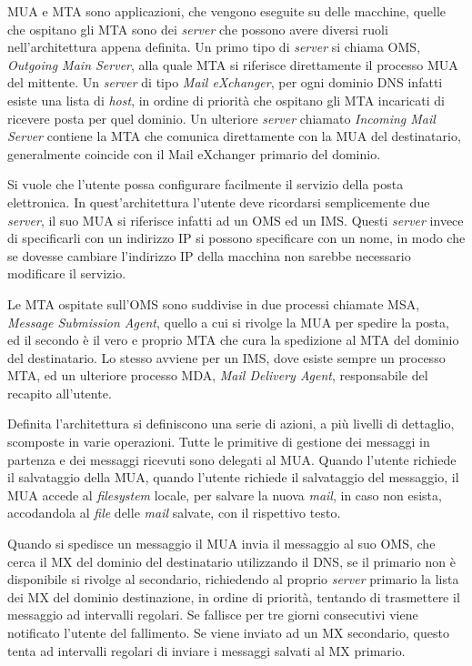 \documentclass{article}
\numberwithin{equation}{subsection}
\begin{document}
MUA e MTA sono applicazioni, che vengono eseguite su delle macchine, quelle che ospitano gli MTA sono dei \textit{server} che possono avere diversi ruoli nell'architettura appena definita. Un primo tipo di \textit{server} si chiama OMS, \textit{Outgoing Main Server}, alla quale MTA si riferisce direttamente il processo MUA del mittente. 
Un \textit{server} di tipo \textit{Mail eXchanger}, per ogni dominio \textcolor{Mahogany}{DNS} infatti esiste una lista di \textit{host}, in ordine di priorità che ospitano gli MTA incaricati di ricevere posta per quel dominio. 
Un ulteriore \textit{server} chiamato \textit{Incoming Mail Server} contiene la MTA che comunica direttamente con la MUA del destinatario, generalmente coincide con il Mail eXchanger primario del dominio. 

Si vuole che l'utente possa configurare facilmente il servizio della posta elettronica. In quest'architettura l'utente deve ricordarsi semplicemente due \textit{server}, il suo MUA si riferisce infatti ad un OMS ed un IMS. Questi \textit{server} invece di specificarli con un indirizzo \textcolor{Bittersweet}{IP} si possono specificare con un nome, in modo che se dovesse cambiare l'indirizzo \textcolor{Bittersweet}{IP} della macchina non sarebbe necessario modificare il servizio. 

Le MTA ospitate sull'OMS sono suddivise in due processi chiamate MSA, \textit{Message Submission Agent}, quello a cui si rivolge la MUA per spedire la posta, ed il secondo è il vero e proprio MTA che cura la spedizione al MTA del dominio del destinatario. Lo stesso avviene per un IMS, dove esiste sempre un processo MTA, ed un ulteriore processo MDA, \textit{Mail Delivery Agent}, responsabile del recapito all'utente. 


Definita l'architettura si definiscono una serie di azioni, a più livelli di dettaglio, scomposte in varie operazioni. Tutte le primitive di gestione dei messaggi in partenza e dei messaggi ricevuti 
sono delegati al MUA. Quando l'utente richiede il salvataggio della MUA, quando l'utente richiede il salvataggio del messaggio, il MUA accede al \textit{filesystem} locale, per salvare la nuova \textit{mail}, in caso non esista, accodandola al \textit{file} delle \textit{mail} salvate, con il rispettivo testo. 

Quando si spedisce un messaggio il MUA invia il messaggio al suo OMS, che cerca il MX del dominio del destinatario utilizzando il \textcolor{Mahogany}{DNS}, se il primario non è disponibile si rivolge al secondario, richiedendo al proprio \textit{server} primario la lista dei MX del dominio destinazione, in ordine di priorità, tentando di trasmettere il messaggio ad intervalli regolari. Se fallisce per tre giorni consecutivi viene notificato l'utente del fallimento. Se viene inviato ad un MX secondario, questo tenta ad intervalli regolari di inviare i messaggi salvati al MX primario. 
\end{document}
